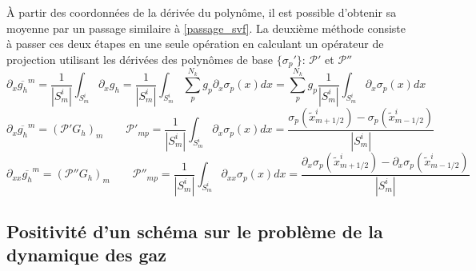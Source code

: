 À partir des coordonnées de la dérivée du polynôme, il est possible d'obtenir sa moyenne par un passage similaire à \eqref{passage_svf}.
La deuxième méthode consiste à passer ces deux étapes en une seule opération en calculant un opérateur de projection utilisant les dérivées des polynômes de base $\{\sigma_p'\}$: $\mathcal{P}'$ et $\mathcal{P}''$
$$\partial_x \overline{g_h}^m = \frac{1}{|S_m^i|} \int_{S_m^i}\partial_x g_h =\frac{1}{|S_m^i|}\int_{S_m^i} \sum_p^{N_k} g_p \partial_x \sigma_p(x)dx = \sum_p^{N_k}g_p \frac{1}{|S_m^i|}\int_{S_m^i} \partial_x \sigma_p(x)dx   $$
\begin{equation}
    \partial_x \overline{g_h}^m = (\mathcal{P}'G_h)_m\qquad \mathcal{P}'_{mp} =  \frac{1}{|S_m^i|}\int_{S_m^i} \partial_x \sigma_p(x)dx = \frac{\sigma_p(\tilde{x}^i_{m+1/2}) - \sigma_p(\tilde{x}^i_{m-1/2})}{|S_m^i|}
\end{equation}
\begin{equation}
    \partial_{xx} \overline{g_h}^m = (\mathcal{P}''G_h)_m\qquad \mathcal{P}''_{mp} =  \frac{1}{|S_m^i|}\int_{S_m^i} \partial_{xx} \sigma_p(x)dx = \frac{\partial_x \sigma_p(\tilde{x}^i_{m+1/2}) - \partial_x \sigma_p(\tilde{x}^i_{m-1/2})}{|S_m^i|}
\end{equation}


\subsection{Positivité d'un schéma sur le problème de la dynamique des gaz}
